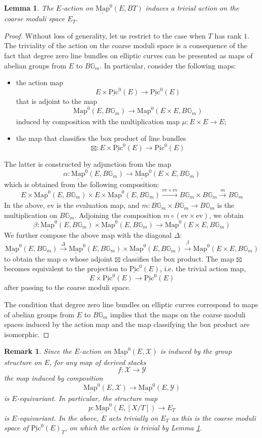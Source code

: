 \documentclass[11pt,letterpaper]{amsart}
\newtheorem{lemma}[dummy]{Lemma}
\newtheorem{remark}[dummy]{Remark}
\newcommand{\bG}{\mathbb{G}}
\newcommand{\cX}{\mathcal{X}}
\newcommand{\cY}{\mathcal{Y}}
\newcommand{\Mapo}[2]{\underline{\mathrm{Map}}^{0}\left (#1,#2\right )}
\newcommand{\Pic}{\underline{\mathrm{Pic}}}
\begin{document}
\begin{lemma}\label{Lemma:trivaction}
The $E$-action on $\Mapo{E}{BT}$ induces a trivial action on the coarse moduli space $E_T$.
\end{lemma}
\begin{proof}
Without loss of generality, let us restrict to the case when $T$ has rank $1$. 
The triviality of the action on the coarse moduli space is a consequence of the fact that degree zero line bundles on elliptic curves can be presented as maps of abelian groups from $E$ to $B\bG_m$. 
In particular, consider the following maps:
\begin{itemize}
\item the action map 
$$E\times \Pic^0(E)\to\Pic^0(E)$$ 
that is adjoint to the map
$$\Mapo{E}{B\bG_m}\to\Mapo{E\times E}{B\bG_m}$$
induced by composition with the multiplication map $\mu : E\times E\to E$;
\item the map that classifies the box product of line bundles
$$\boxtimes:E\times\Pic^0(E)\to\Pic^0(E)$$
\end{itemize}
The latter is constructed by adjunction from the map
$$\alpha:\Mapo{E}{B\bG_m}\to\Mapo{E\times E}{B\bG_m}$$
which is obtained from the following composition:
$$E\times\Mapo{E}{B\bG_m}\times E\times\Mapo{E}{B\bG_m}\xrightarrow{\mathrm{ev}\times\mathrm{ev}}B\bG_m\times B\bG_m\xrightarrow{m}B\bG_m$$
In the above, $\mathrm{ev}$ is the evaluation map, and $m:B\bG_m\times B\bG_m\to B\bG_m$ is the multiplication on $B\bG_m$. Adjoining the composition $m\circ (\mathrm{ev}\times \mathrm{ev})$, we obtain
$$\beta:\Mapo{E}{B\bG_m}\times\Mapo{E}{B\bG_m}\to\Mapo{E\times E}{B\bG_m}$$
We further compose the above map with the diagonal $\Delta$:
$$\Mapo{E}{B\bG_m}\xrightarrow{\Delta}\Mapo{E}{B\bG_m}\times\Mapo{E}{B\bG_m}\xrightarrow{\beta}\Mapo{E\times E}{B\bG_m}$$
to obtain the map $\alpha$ whose adjoint $\boxtimes$ classifies the box product. The map $\boxtimes$ becomes equivalent to the projection to $\Pic^0(E)$, i.e. the trivial action map,
$$E\times\Pic^0(E)\to\Pic^0(E)$$
after passing to the coarse moduli space.

The condition that degree zero line bundles on elliptic curves correspond to maps of abelian groups from $E$ to $B\bG_m$ implies that the maps on the coarse moduli spaces induced by the action map and the map classifying the box product are isomorphic.
\end{proof}

\begin{remark}\label{remark:pEequivariant}
Since the $E$-action on $\Mapo{E}{\cX}$ is induced by the group structure on $E$, for any map of derived stacks $$f:\cX\to \cY$$ the map induced by composition 
$$\Mapo{E}{\cX}\to \Mapo{E}{\cY}$$
is $E$-equivariant. In particular, the structure map
$$p:\Mapo{E}{[X/T]}\to E_T$$
is $E$-equivariant. In the above, $E$ acts trivially on $E_T$ as this is the coarse moduli space of $\Pic^0(E)_T$, on which the action is trivial by Lemma \ref{Lemma:trivaction}.
\end{remark}
\end{document}
